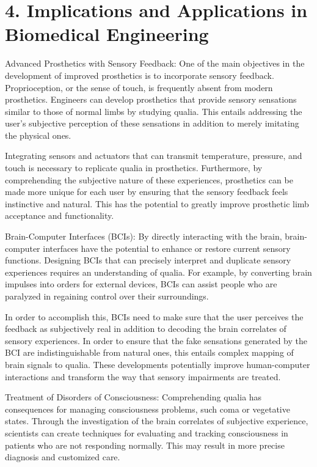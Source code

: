 \documentclass{article}
\begin{document}
\section*{4. Implications and Applications in Biomedical Engineering}

Advanced Prosthetics with Sensory Feedback:
One of the main objectives in the development of improved prosthetics is to incorporate sensory feedback. Proprioception, or the sense of touch, is frequently absent from modern prosthetics. Engineers can develop prosthetics that provide sensory sensations similar to those of normal limbs by studying qualia. This entails addressing the user's subjective perception of these sensations in addition to merely imitating the physical ones.

Integrating sensors and actuators that can transmit temperature, pressure, and touch is necessary to replicate qualia in prosthetics. Furthermore, by comprehending the subjective nature of these experiences, prosthetics can be made more unique for each user by ensuring that the sensory feedback feels instinctive and natural. This has the potential to greatly improve prosthetic limb acceptance and functionality.


Brain-Computer Interfaces (BCIs):
By directly interacting with the brain, brain-computer interfaces have the potential to enhance or restore current sensory functions. Designing BCIs that can precisely interpret and duplicate sensory experiences requires an understanding of qualia. For example, by converting brain impulses into orders for external devices, BCIs can assist people who are paralyzed in regaining control over their surroundings.

In order to accomplish this, BCIs need to make sure that the user perceives the feedback as subjectively real in addition to decoding the brain correlates of sensory experiences. In order to ensure that the fake sensations generated by the BCI are indistinguishable from natural ones, this entails complex mapping of brain signals to qualia. These developments potentially improve human-computer interactions and transform the way that sensory impairments are treated.


Treatment of Disorders of Consciousness:
Comprehending qualia has consequences for managing consciousness problems, such coma or vegetative states. Through the investigation of the brain correlates of subjective experience, scientists can create techniques for evaluating and tracking consciousness in patients who are not responding normally. This may result in more precise diagnosis and customized care.
\end{document}
